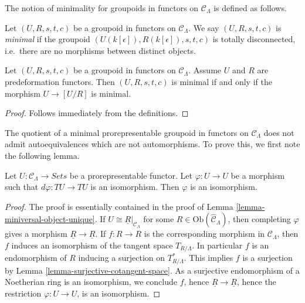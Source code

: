 \noindent
The notion of minimality for groupoids in functors on $\mathcal{C}_\Lambda$ is 
defined as follows.

\begin{definition}
\label{definition-minimal-groupoid-in-functors}
Let $(U, R, s,t,c)$ be a groupoid in functors on $\mathcal{C}_\Lambda$.  We 
say $(U, R, s,t,c)$ is {\it minimal} if the groupoid 
$(U(k[\epsilon]),R(k[\epsilon]), s,t,c)$ is totally disconnected, i.e.\ 
there are no morphisms between distinct objects.
\end{definition}

\begin{lemma}
\label{lemma-characterize-minimal-groupoid-in-functors}
Let $(U, R, s,t,c)$ be a groupoid in functors on $\mathcal{C}_\Lambda$.  
Assume $U$ and $R$ are predeformation functors.  Then $(U,R,s,t,c)$ is minimal 
if and only if the morphism $U \to [U/R]$ is minimal.
\end{lemma}

\begin{proof}
Follows immediately from the definitions.
\end{proof}

\noindent
The quotient of a minimal prorepresentable groupoid in functors on $\mathcal 
C_\Lambda$ does not admit autoequivalences which are not automorphisms.  To 
prove this, we first note the following lemma.

\begin{lemma}
\label{lemma-surjective-morphism-prorepresentable-functor}
Let $U: \mathcal{C}_\Lambda \to \textit{Sets}$ be a 
prorepresentable functor.  Let $\varphi: U \to U$ be a morphism such 
that $d\varphi: TU \to TU$ is an isomorphism.  Then $\varphi$ is an 
isomorphism.
\end{lemma}

\begin{proof}
The proof is essentially contained in the proof of Lemma 
\ref{lemma-miniversal-object-unique}. If $U \cong \underline{R}|_{\mathcal 
C_\Lambda}$ for some $R \in \text{Ob}(\widehat{\mathcal{C}}_\Lambda)$, 
then completing $\varphi$ gives a morphism $\underline{R} \to 
\underline{R}$.  If $f: R \to R$ is the corresponding morphism in 
$\mathcal{C}_\Lambda$, then $f$ induces an isomorphism of the tangent space 
$T_{R/\Lambda}$.  In particular $f$ is an endomorphism of $R$ inducing a 
surjection on $T^*_{R/\Lambda}$.  This implies $f$ is a surjection by Lemma 
\ref{lemma-surjective-cotangent-space}. As a surjective endomorphism of a 
Noetherian ring is an isomorphism, we conclude $f$, hence $\underline{R} 
\to \underline{R}$, hence the restriction $\varphi: U \to U$, 
is an isomorphism.
\end{proof}

